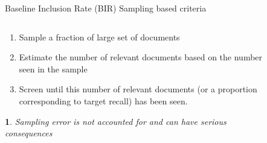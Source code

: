 \documentclass[9pt, aspectratio=169]{beamer}
\newtheorem*{remark}{}
\begin{document}
\begin{frame}{Baseline Inclusion Rate (BIR) Sampling based criteria}
\begin{columns}
	\begin{column}{0.382\linewidth}
		\begin{enumerate}
			\item Sample a fraction of large set of documents
			\item Estimate the number of relevant documents based on the number seen in the sample
			\item Screen until this number of relevant documents (or a proportion corresponding to target recall) has been seen.
		\end{enumerate}
	
		\begin{remark}
			Sampling error is not accounted for and can have serious consequences
		\end{remark}
	\end{column}
	\begin{column}{0.618\linewidth}
		\begin{figure}
\end{figure}
\end{column}
\end{columns}
\end{frame}
\end{document}
